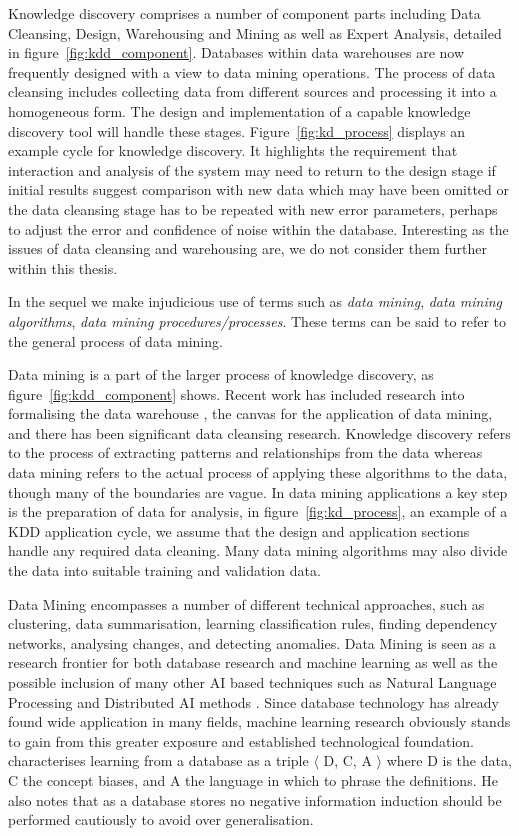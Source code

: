\medskip
Knowledge discovery comprises a number of component parts including
Data Cleansing, Design, Warehousing and Mining as well as Expert
Analysis, detailed in figure~\ref{fig:kdd_component}. Databases within
data warehouses are now frequently designed with a view to data mining
operations. The process of data cleansing includes collecting data
from different sources and processing it into a homogeneous form. The
design and implementation of a capable knowledge discovery tool will handle
these stages. Figure~\ref{fig:kd_process} displays an example cycle
for knowledge discovery. It highlights the requirement that
interaction and analysis of the system may need to return to the
design stage if initial results suggest comparison with new data which
may have been omitted or the data cleansing stage has to be repeated
with new error parameters, perhaps to adjust the error and confidence
of noise within the database.  Interesting as the issues of data
cleansing and warehousing are, we do not consider them further within
this thesis.

\medskip

In the sequel we make injudicious use of terms such as {\em data
mining}, {\em data mining algorithms}, {\em data mining
procedures/processes}. These terms can be said to refer to the general
process of data mining. 

\medskip

Data mining is a part of the larger process of knowledge discovery, as
figure~\ref{fig:kdd_component} shows. Recent work has included
research into formalising the data warehouse \cite{hgmw95,inm96a}, the canvas for
the application of data mining, and there has been significant
data cleansing research.  Knowledge
discovery refers to the process of extracting patterns and relationships 
from the data whereas data mining refers to the actual process of applying
these algorithms to the data, though many of the boundaries are vague.
In data mining applications a key step is 
the preparation of data for analysis, in figure~\ref{fig:kd_process},
an example of a KDD application cycle, we assume that the
design and application sections handle any required data
cleaning. Many data mining algorithms may also divide the data into suitable training and validation data.

Data Mining encompasses a number of different
technical approaches, such as clustering, data summarisation, learning
classification rules, finding dependency networks, analysing changes,
and detecting anomalies.  Data Mining is seen as a research frontier
for both database research and machine learning as well as the  
possible inclusion of many other AI based techniques such as Natural Language 
Processing and Distributed AI methods \cite{kdd96}.  Since database 
technology has already found  
wide application in many fields, machine learning research obviously
stands to gain from this greater exposure and established
technological foundation. \cite{xiao95} characterises learning from a
database as a triple $\langle$ D, C, A $\rangle$ where 
D is the data, C the concept biases, and A the language in which to
phrase the definitions. He also notes that as a database stores no  
negative information induction should be performed cautiously to avoid
over generalisation.
\medskip

